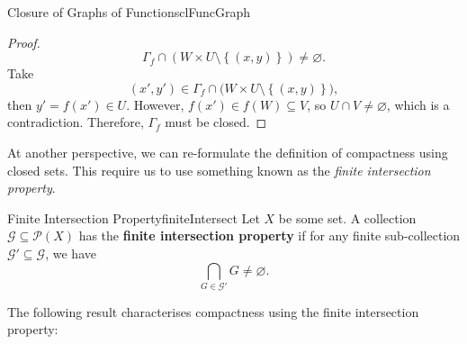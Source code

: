 \documentclass[math]{amznotes}
\theoremstyle{remark}
\begin{document}
\begin{probox}{Closure of Graphs of Functions}{clFuncGraph}
\begin{proof}
        \begin{equation*}
            \Gamma_f \cap \left(W \times U \setminus \left\{\left(x, y\right)\right\}\right) \neq \varnothing.
        \end{equation*}
        Take 
        \begin{equation*}
            \left(x', y'\right) \in \Gamma_f \cap \bigl(W \times U \setminus \left\{\left(x, y\right)\right\}\bigr),
        \end{equation*}
        then $y' = f\left(x'\right) \in U$. However, $f\left(x'\right) \in f\left(W\right) \subseteq V$, so $U \cap V \neq \varnothing$, which is a contradiction. Therefore, $\Gamma_f$ must be closed.
    \end{proof}
\end{probox}
At another perspective, we can re-formulate the definition of compactness using closed sets. This require us to use something known as the \textit{finite intersection property}.
\begin{dfnbox}{Finite Intersection Property}{finiteIntersect}
    Let $X$ be some set. A collection $\mathcal{G} \subseteq \mathcal{P}\left(X\right)$ has the {\color{red} \textbf{finite intersection property}} if for any finite sub-collection $\mathcal{G}' \subseteq \mathcal{G}$, we have 
    \begin{equation*}
        \bigcap_{G \in \mathcal{G}'}G \neq \varnothing.
    \end{equation*}
\end{dfnbox}
The following result characterises compactness using the finite intersection property:
\end{document}
